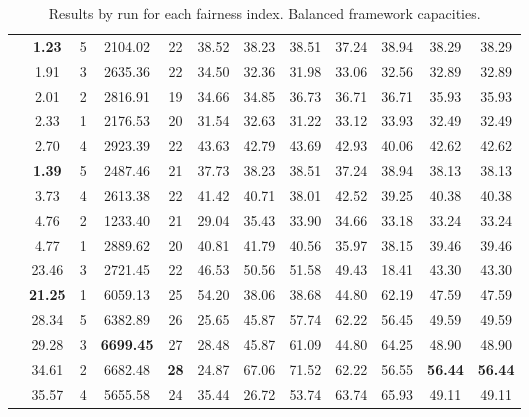 \documentclass[preprint,12pt]{elsarticle}
\begin{document}
\begin{table}[htbp]
\begin{adjustbox}{max width=\textwidth}
\begin{tabular}{|c|c|c|c|c|c|c|c|c|c|c|c|}
\parbox[t]{2mm}{} & \textbf{1.23} & 5 & 2104.02 & 22 & 38.52 & 38.23 & 38.51 & 37.24 & 38.94 & 38.29 & 38.29 \\ 
& 1.91 & 3 & 2635.36 & 22 & 34.50 & 32.36 & 31.98 & 33.06 & 32.56 & 32.89 & 32.89 \\
& 2.01 & 2 & 2816.91 & 19 & 34.66 & 34.85 & 36.73 & 36.71 & 36.71 & 35.93 & 35.93 \\ 
& 2.33 & 1 & 2176.53 & 20 & 31.54 & 32.63 & 31.22 & 33.12 & 33.93 & 32.49 & 32.49 \\ 
& 2.70 & 4 & 2923.39 & 22 & 43.63 & 42.79 & 43.69 & 42.93 & 40.06 & 42.62 & 42.62 \\ \hline

\parbox[t]{2mm}{} & \textbf{1.39 } & 5 & 2487.46 & 21 & 37.73 & 38.23 & 38.51 & 37.24 & 38.94 & 38.13 & 38.13 \\
& 3.73 & 4 & 2613.38 & 22 & 41.42 & 40.71 & 38.01 & 42.52 & 39.25 & 40.38 & 40.38 \\
& 4.76 & 2 & 1233.40 & 21 & 29.04 & 35.43 & 33.90 & 34.66 & 33.18 & 33.24 & 33.24 \\ 
& 4.77 & 1 & 2889.62 & 20 & 40.81 & 41.79 & 40.56 & 35.97 & 38.15 & 39.46 & 39.46 \\ 
& 23.46 & 3 & 2721.45 & 22 & 46.53 & 50.56 & 51.58 & 49.43 & 18.41 & 43.30 & 43.30 \\ \hline

\parbox[t]{2mm}{} & \textbf{21.25} & 1 & 6059.13 & 25 & 54.20 & 38.06 & 38.68 & 44.80 & 62.19 & 47.59 & 47.59 \\ 
& 28.34 & 5 & 6382.89 & 26 & 25.65 & 45.87 & 57.74 & 62.22 & 56.45 & 49.59 & 49.59 \\ 
& 29.28 & 3 & \textbf{6699.45} & 27 & 28.48 & 45.87 & 61.09 & 44.80 & 64.25 & 48.90 & 48.90 \\ 
& 34.61 & 2 & 6682.48 & \textbf{28} & 24.87 & 67.06 & 71.52 & 62.22 & 56.55 & \textbf{56.44} & \textbf{56.44} \\
& 35.57 & 4 & 5655.58 & 24 & 35.44 & 26.72 & 53.74 & 63.74 & 65.93 & 49.11 & 49.11 \\ \hline
\end{tabular}
\end{adjustbox}
\caption{Results by run for each fairness index. Balanced framework capacities.}
\label{tab:balanced_capacities}
\end{table}
\end{document}

